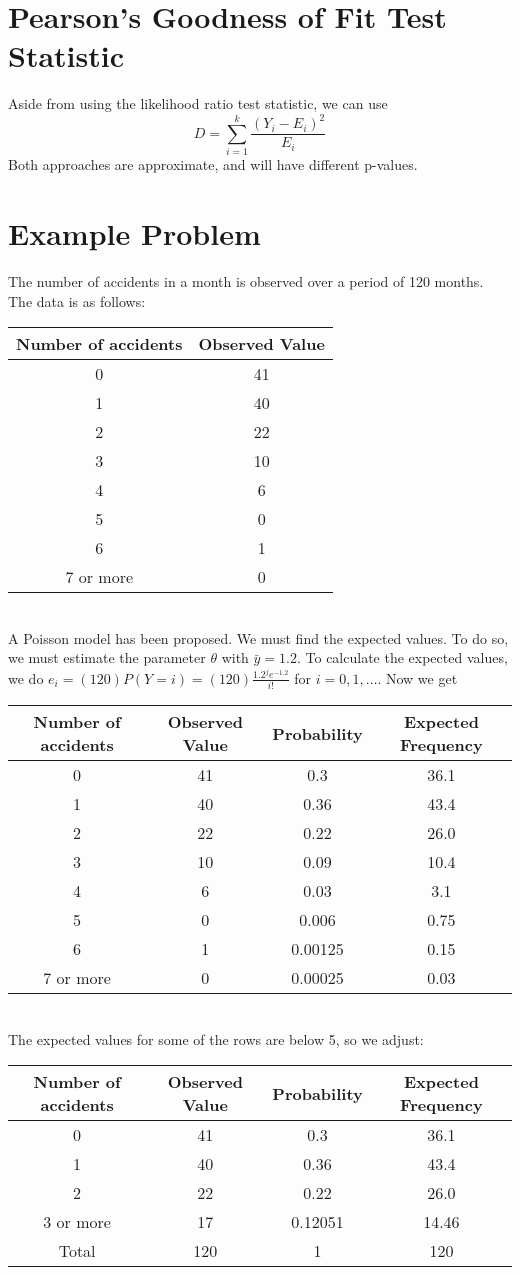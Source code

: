\documentclass[12pt]{article}
\begin{document}
\section{Pearson's Goodness of Fit Test Statistic}
Aside from using the likelihood ratio test statistic, we can use \[D=\sum_{i=1}^k\frac{(Y_i-E_i)^2}{E_i}\]
Both approaches are approximate, and will have different p-values.

\section{Example Problem}
The number of accidents in a month is observed over a period of 120 months. The data is as follows:\\
\begin{tabular}{c|c}
    Number of accidents & Observed Value\\\hline
    0 & 41\\
    1 & 40\\
    2 & 22\\
    3 & 10\\
    4 & 6\\
    5 & 0\\
    6 & 1\\
    7 or more & 0
\end{tabular}\\
A Poisson model has been proposed. We must find the expected values. To do so, we must estimate the parameter $\theta$ with $\bar y=1.2$. To calculate the expected values, we do $e_i=(120)P(Y=i)=(120)\frac{1.2^je^{-1.2}}{i!}$ for $i=0,1,\dots$. Now we get\\
\begin{tabular}{c|c|c|c}
    Number of accidents & Observed Value & Probability & Expected Frequency\\\hline
    0 & 41 & 0.3 & 36.1\\
    1 & 40 & 0.36 & 43.4\\
    2 & 22 & 0.22 & 26.0\\
    3 & 10 & 0.09 & 10.4\\
    4 & 6 & 0.03 & 3.1\\
    5 & 0 & 0.006 & 0.75\\
    6 & 1 & 0.00125 & 0.15\\
    7 or more & 0 & 0.00025 & 0.03
\end{tabular}\\
The expected values for some of the rows are below 5, so we adjust:\\
\begin{tabular}{c|c|c|c}
    Number of accidents & Observed Value & Probability & Expected Frequency\\\hline
    0 & 41 & 0.3 & 36.1\\
    1 & 40 & 0.36 & 43.4\\
    2 & 22 & 0.22 & 26.0\\
    3 or more & 17 & 0.12051 & 14.46\\
    Total & 120 & 1 & 120
\end{tabular}\\
\end{document}
